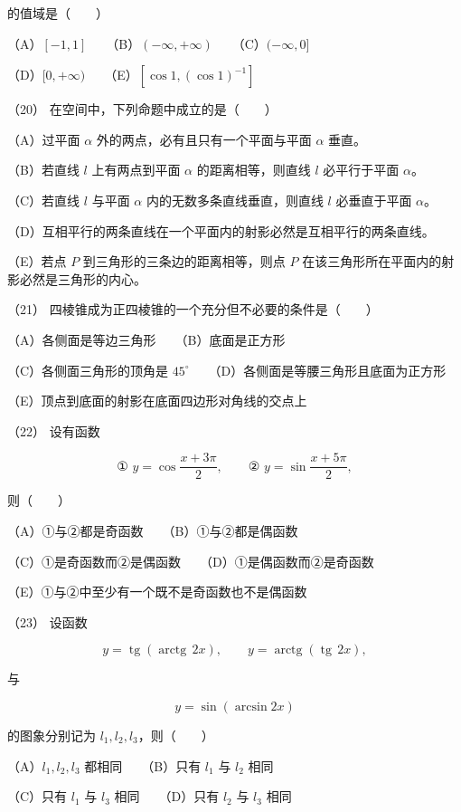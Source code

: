\begin{question}
的值域是\mbox{（　　）}

（A）$[-1,1]$　　（B）$(-\infty,+\infty)$　　（C）$(-\infty,0]$

（D）$[0,+\infty)$　　（E）$[\cos1,(\cos1)^{-1}]$

（20） 在空间中，下列命题中成立的是\mbox{（　　）}

（A）过平面 $\alpha$ 外的两点，必有且只有一个平面与平面 $\alpha$ 垂直。

（B）若直线 $l$ 上有两点到平面 $\alpha$ 的距离相等，则直线 $l$ 必平行于平面 $\alpha$。

（C）若直线 $l$ 与平面 $\alpha$ 内的无数多条直线垂直，则直线 $l$ 必垂直于平面 $\alpha$。

（D）互相平行的两条直线在一个平面内的射影必然是互相平行的两条直线。

（E）若点 $P$ 到三角形的三条边的距离相等，则点 $P$ 在该三角形所在平面内的射影必然是三角形的内心。

（21） 四棱锥成为正四棱锥的一个充分但不必要的条件是\mbox{（　　）}

（A）各侧面是等边三角形　　（B）底面是正方形

（C）各侧面三角形的顶角是 $45^\circ$　　（D）各侧面是等腰三角形且底面为正方形

（E）顶点到底面的射影在底面四边形对角线的交点上

（22） 设有函数

\nopagebreak[4]
\[
\text{① }y=\cos\frac{x+3\pi}{2},\qquad
\text{② }y=\sin\frac{x+5\pi}{2},
\]

则\mbox{（　　）}

（A）①与②都是奇函数　　（B）①与②都是偶函数

（C）①是奇函数而②是偶函数　　（D）①是偶函数而②是奇函数

（E）①与②中至少有一个既不是奇函数也不是偶函数

（23） 设函数

\nopagebreak[4]
\[
y=\operatorname{tg}(\operatorname{arctg}\,2x),\qquad
y=\operatorname{arctg}(\operatorname{tg}\,2x),
\]

与

\nopagebreak[4]
\[
y=\sin(\arcsin 2x)
\]

的图象分别记为 $l_1,l_2,l_3$，则\mbox{（　　）}

（A）$l_1,l_2,l_3$ 都相同　　（B）只有 $l_1$ 与 $l_2$ 相同

（C）只有 $l_1$ 与 $l_3$ 相同　　（D）只有 $l_2$ 与 $l_3$ 相同


\end{question}
